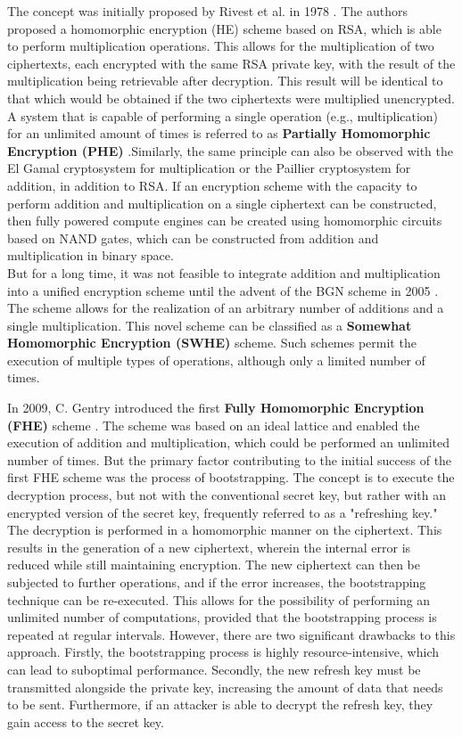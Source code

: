 The concept was initially proposed by Rivest et al. in 1978 \cite{Rivest1978}. The authors proposed a homomorphic encryption (HE) scheme based on RSA, which is able to perform multiplication operations. This allows for the multiplication of two ciphertexts, each encrypted with the same RSA private key, with the result of the multiplication being retrievable after decryption. This result will be identical to that which would be obtained if the two ciphertexts were multiplied unencrypted. A system that is capable of performing a single operation (e.g., multiplication) for an unlimited amount of times is referred to as \textbf{Partially Homomorphic Encryption (PHE)}  \cite{FheImplementations, SurveyOfHomomorphicEncryption}.Similarly, the same principle can also be observed with the El Gamal cryptosystem \cite{ElGamal} for multiplication or the Paillier cryptosystem \cite{Paillier} for addition, in addition to RSA. If an encryption scheme with the capacity to perform addition and multiplication on a single ciphertext can be constructed, then fully powered compute engines can be created using homomorphic circuits based on NAND gates, which can be constructed from addition and multiplication in binary space. \\
But for a long time, it was not feasible to integrate addition and multiplication into a unified encryption scheme until the advent of the BGN scheme in 2005 \cite{BGN}. The scheme allows for the realization of an arbitrary number of additions and a single multiplication. This novel scheme can be classified as a  \textbf{Somewhat Homomorphic Encryption (SWHE)}  scheme. Such schemes permit the execution of multiple types of operations, although only a limited number of times.

In 2009, C. Gentry introduced the first  \textbf{Fully Homomorphic Encryption (FHE)} scheme \cite{Gentry2009AFH}. The scheme was based on an ideal lattice and enabled the execution of addition and multiplication, which could be performed an unlimited number of times. But the primary factor contributing to the initial success of the first FHE scheme was the process of bootstrapping. The concept is to execute the decryption process, but not with the conventional secret key, but rather with an encrypted version of the secret key, frequently referred to as a "refreshing key." The decryption is performed in a homomorphic manner on the ciphertext. This results in the generation of a new ciphertext, wherein the internal error is reduced while still maintaining encryption. The new ciphertext can then be subjected to further operations, and if the error increases, the bootstrapping technique can be re-executed. This allows for the possibility of performing an unlimited number of computations, provided that the bootstrapping process is repeated at regular intervals. However, there are two significant drawbacks to this approach. Firstly, the bootstrapping process is highly resource-intensive, which can lead to suboptimal performance. Secondly, the new refresh key must be transmitted alongside the private key, increasing the amount of data that needs to be sent. Furthermore, if an attacker is able to decrypt the refresh key, they gain access to the secret key. 


